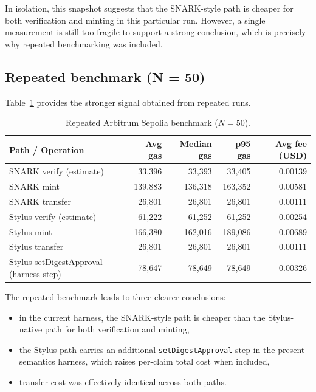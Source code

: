\documentclass[11pt]{article}
\begin{document}
In isolation, this snapshot suggests that the SNARK-style path is cheaper for both verification and minting in this particular run. However, a single measurement is still too fragile to support a strong conclusion, which is precisely why repeated benchmarking was included.

\subsection{Repeated benchmark (N = 50)}
Table~\ref{tab:repeat} provides the stronger signal obtained from repeated runs.

\begin{table}[htbp]
\centering
\small
\caption{Repeated Arbitrum Sepolia benchmark (\(N = 50\)).}
\label{tab:repeat}
\begin{tabular}{lrrrr}
\toprule
\textbf{Path / Operation} & \textbf{Avg gas} & \textbf{Median gas} & \textbf{p95 gas} & \textbf{Avg fee (USD)} \\
\midrule
SNARK verify (estimate) & 33,396 & 33,393 & 33,405 & 0.00139 \\
SNARK mint & 139,883 & 136,318 & 163,352 & 0.00581 \\
SNARK transfer & 26,801 & 26,801 & 26,801 & 0.00111 \\
\midrule
Stylus verify (estimate) & 61,222 & 61,252 & 61,252 & 0.00254 \\
Stylus mint & 166,380 & 162,016 & 189,086 & 0.00689 \\
Stylus transfer & 26,801 & 26,801 & 26,801 & 0.00111 \\
Stylus setDigestApproval (harness step) & 78,647 & 78,649 & 78,649 & 0.00326 \\
\bottomrule
\end{tabular}
\end{table}

The repeated benchmark leads to three clearer conclusions:

\begin{itemize}
  \item in the current harness, the SNARK-style path is cheaper than the Stylus-native path for both verification and minting,
  \item the Stylus path carries an additional \texttt{setDigestApproval} step in the present semantics harness, which raises per-claim total cost when included,
  \item transfer cost was effectively identical across both paths.
\end{itemize}
\end{document}
